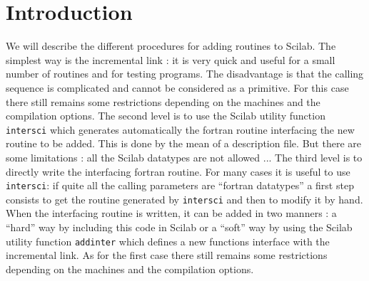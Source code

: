 
\chapter{Introduction}

We will describe the different procedures for adding routines to Scilab.
The simplest way is the incremental link : it is very quick and useful 
for a small number of routines and for testing programs. The disadvantage
is that the calling sequence is complicated and cannot be considered as a 
primitive. For this case there still remains some restrictions depending on
the machines and the compilation options.
The second level is to use the Scilab utility function {\tt intersci} which 
generates  automatically the 
fortran routine interfacing the new routine to be added. This is done by the 
mean of a description file. But there are some limitations : all the Scilab 
datatypes are not allowed ...
The third level is to directly write the interfacing fortran routine. For many
cases it is useful to use {\tt intersci}: if quite all the calling parameters 
are ``fortran datatypes'' a first step consists to get the routine
generated by {\tt intersci} and then to modify it by hand.
When the interfacing routine is written, it can be added in two manners :
a ``hard'' way by including this code in Scilab or a ``soft'' way by using
the Scilab utility function {\tt addinter} which defines a new functions 
interface with the incremental link. As for the first case there still 
remains some restrictions depending on the machines and the compilation 
options.



